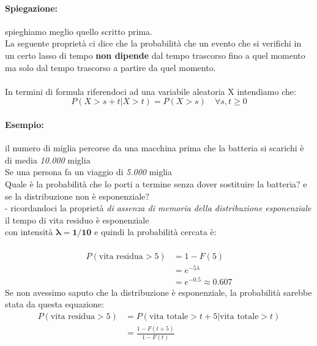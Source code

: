 \documentclass[]{article}
\begin{document}
    \paragraph{Spiegazione:} spieghiamo meglio quello scritto prima. \\
    La seguente proprietà ci dice che la probabilità che un evento che si verifichi in un certo lasso di tempo \textbf{non dipende} dal tempo
    trascorso fino a quel momento \\
    ma solo dal tempo trascorso a partire da quel momento. \\ \\
    In termini di formula riferendoci ad una variabile aleatoria X intendiamo che:
    \[ P(X > s + t | X > t) = P(X > s) \quad \forall s,t \geq 0 \]
    \paragraph{Esempio:} il numero di miglia percorse da una macchina prima che la batteria si scarichi è di media \textit{10.000} miglia \\
    Se una persona fa un viaggio di \textit{5.000} miglia \\
    Quale è la probabilità che lo porti a termine senza dover sostituire la batteria? e se la distribuzione non è esponenziale? \\
    - ricordandoci la proprietà \textit{di assenza di memoria della distribuzione esponenziale} il tempo di vita residuo è esponenziale \\
    con intensità $\boldsymbol{\lambda = 1 / 10}$ e quindi la probabilità cercata è: \\ \\
    \begin{equation*}
        \begin{split}
            P(\text{vita residua} > 5) &= 1 - F(5) \\
            &= e^{-5\lambda} \\
            &= e^{-0.5} \approx 0.607
        \end{split}
    \end{equation*}
    Se non avessimo saputo che la distribuzione è esponenziale, la probabilità sarebbe stata da questa equazione:
    \begin{equation*}
        \begin{split}
            P(\text{vita residua} > 5) &= P(\text{vita totale} > t + 5 | \text{vita totale} > t) \\
            &= \frac{1 - F(t + 5)}{1 - F(t)}
        \end{split}
    \end{equation*}
\end{document}
